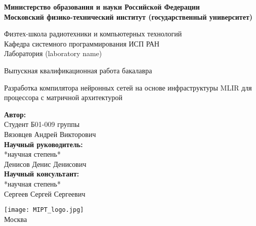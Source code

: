 \begin{center}
    \large\textbf{Министерство образования и науки Российской Федерации \\
    Московский физико-технический институт (государственный
    университет)} \\
    \vspace{1cm}

    Физтех-школа радиотехники и компьютерных технологий \\

    Кафедра системного программирования ИСП РАН \\
    Лаборатория (laboratory name)\\

    \vspace{3em}

    Выпускная квалификационная работа бакалавра
\end{center}

\begin{center}
    \vspace{\fill}
    \LARGE{Разработка компилятора нейронных сетей на основе инфраструктуры MLIR для процессора с матричной архитектурой}

    \vspace{\fill}
\end{center}


\begin{flushright}
    \textbf{Автор:} \\
    Студент Б01-009 группы \\
    Вязовцев Андрей Викторович \\
    \vspace{2em}
    \textbf{Научный руководитель:} \\
    *научная степень* \\
    Денисов Денис Денисович \\
    \vspace{2em}
    \textbf{Научный консультант:} \\
    *научная степень* \\
    Сергеев Сергей Сергеевич \\
\end{flushright}

\vspace{7em}

\begin{center}
    \texttt{[image: MIPT\_logo.jpg]}\\
    Москва \the\year{}
\end{center}

\thispagestyle{empty}

\newpage
\setcounter{page}{2}
\fancyfoot[c]{\thepage}
\fancyhead[R]{}